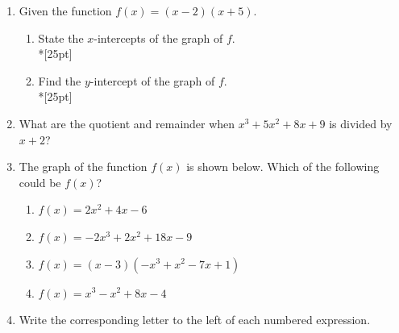 \documentclass[12pt, oneside]{article}
\begin{document}
\begin{enumerate}
\newpage
\item Given the function $f(x)=(x-2)(x+5)$. 
\begin{enumerate}
    \item State the $x$-intercepts of the graph of $f$. \\*[25pt]
    \item Find the $y$-intercept of the graph of $f$.\\*[25pt]
\end{enumerate}



\item What are the quotient and remainder when $x^3+5x^2+8x+9$ is divided by $x+2$?

\newpage
\item The graph of the function $f(x)$ is shown below. Which of the following could be $f(x)$?
\begin{enumerate}
    \item $f(x)=2x^2+4x-6$
    \item $f(x)=-2x^3+2x^2+18x-9$
    \item $f(x)=(x-3)(-x^3+x^2-7x+1)$
    \item $f(x)=x^3-x^2+8x-4$
\end{enumerate}
\begin{center}
\end{center}
\item Write the corresponding letter to the left of each numbered expression.
\begin{figure}[!ht]
    \centering

\end{figure}
\end{enumerate}
\end{document}
